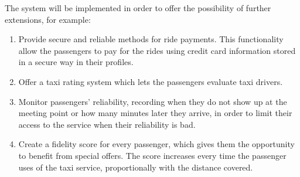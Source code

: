 The system will be implemented in order to offer the possibility of further extensions, for example:

\begin{enumerate}
    \item Provide secure and reliable methods for ride payments. This functionality allow the passengers to pay for the rides using credit card information stored in a secure way in their profiles.
    \item Offer a taxi rating system which lets the passengers evaluate taxi drivers.
    \item Monitor passengers' reliability, recording when they do not show up at the meeting point or how many minutes later they arrive, in order to limit their access to the service when their reliability is bad.
    \item Create a fidelity score for every passenger, which gives them the opportunity to benefit from special offers. The score increases every time the passenger uses of the taxi service, proportionally with the distance covered.
\end{enumerate}
